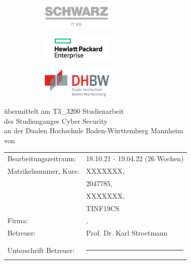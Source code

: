 %
\begin{titlepage}
\makeatletter
\vfill
	
\begin{center}
	\begin{figure}[t!]
		\vspace*{-1cm}
		\centering
		\begin{subfigure}[rt!]{0.3\linewidth}
			\centering\includegraphics[width=100pt]{Images/schwarz}
		\end{subfigure}
		\begin{subfigure}[lt!]{0.3\linewidth}
			\centering\includegraphics[width=100pt]{Images/hpe}
		\end{subfigure}
		\begin{subfigure}[lt!]{0.3\linewidth}
			\centering\includegraphics[width=100pt]{Images/dhbw}
		\end{subfigure}
	\end{figure}
	
	\vfill
	{\LARGE \bfseries \varTitle \par}
	\vfill
	\vfill
	\large \varReportType
	\vfill
	übermittelt am \varDate
	\vfill
	\vfill
	\vfill
	T3\_3200 Studienarbeit\\
	des Studienganges Cyber Security\\
	an der Dualen Hochschule Baden-Württemberg Mannheim\\
	\vfill
	von \\
	\varAuthor
	\vfill
	\vfill
	\vfill
	
\end{center}

\begin{tabular}{ p{7cm} p{6cm} }
	Bearbeitungszeitraum: 	& 18.10.21 - 19.04.22 (26 Wochen)\\
	Matrikelnummer, Kurs: 	& XXXXXXX, \\&2047785, \\&XXXXXXX, \\&TINF19CS \\
	Firma: 				& \varCompany, \varLocation  \\
	Betreuer: 				& Prof. Dr. Karl Stroetmann \\
	\\
	Unterschrift Betreuer: 	& \rule{6cm}{0.4pt}\\
\end{tabular}

\end{titlepage}
%